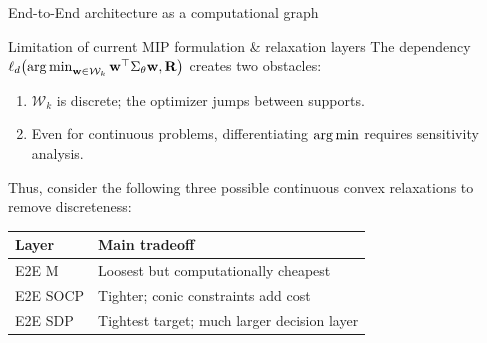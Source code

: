 \documentclass[10pt,aspectratio=169]{beamer}
\newcommand{\Kcard}{k}
\newcommand{\Wset}{\mathcal{W}}
\newcommand{\Param}{\theta}
\newcommand{\SigmaMat}{\Sigma}
\begin{document}
\begin{frame}{End-to-End architecture as a computational graph}
{{
  }%
  }
\end{frame}


\begin{frame}{Limitation of current MIP formulation \& relaxation layers}
    \small 
The dependency $\ell_d\!\left(\argmin_{\mathbf{w}\in\Wset_\Kcard}\mathbf{w}^\top \SigmaMat_\Param \mathbf{w},\mathbf{R}\right)$ creates two obstacles:

{\addtolength{\leftmargini}{1em}
\begin{enumerate}
  \item $\Wset_\Kcard$ is discrete; the optimizer jumps between supports.
  \item Even for continuous problems, differentiating $\operatorname*{arg\,min}$ requires sensitivity analysis.
\end{enumerate}
}

Thus, consider the following three possible continuous convex relaxations to remove discreteness:
\vspace{1em}

{
\centering
\begin{tabular}{>{\raggedright\arraybackslash}p{.2\linewidth}
                >{\raggedright\arraybackslash}p{.44\linewidth}}
  \toprule
  Layer & Main tradeoff \\
  \midrule
  E2E M & Loosest but computationally cheapest \\
  E2E SOCP \cite{CuiZhengZhuSun2013Relaxations} & Tighter; conic constraints add cost \\
  E2E SDP \cite{WiegeleZhao2022SDP} & Tightest target; much larger decision layer \\
  \bottomrule
\end{tabular}
\par
}

\end{frame}
\end{document}
